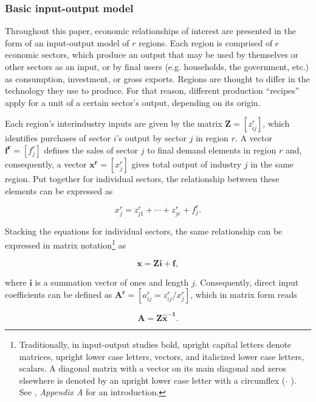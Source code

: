 \documentclass[a4paper,12pt, ]{article}
\begin{document}
\subsubsection[]{Basic input-output model} 
\label{sec:basicio}

Throughout this paper, economic relationships of interest are presented in the form of an input-output model of $r$ regions. Each region is comprised of $e$ economic sectors, which produce an output that may be used by themselves or other sectors as an input, or by final users (e.g. households, the government, etc.) as consumption, investment, or gross exports. Regions are thought to differ in the technology they use to produce. For that reason, different production ``recipes'' apply for a unit of a certain sector's
output, depending on its origin.

Each region's interindustry inputs are given by the matrix $\mathbf{Z}=[z^r_{ij}]$, which identifies purchases of sector $i$'s output by sector $j$ in region $r$. A vector $\mathbf{f^r}=[f^r_j]$ defines the sales of sector $j$ to final demand elements in region $r$ and, consequently, a vector $\mathbf{x^r}=[x^r_j]$ gives total output of industry $j$ in the same region. Put together for individual sectors, the relationship between these elements can be expressed as

\begin{equation} 
x^r_j=z^r_{j1}+\cdots+z^r_{je}+f^r_j. 
\label{01} 
\end{equation} 

Stacking the equations for individual sectors, the same relationship can be expressed in matrix notation\footnote{Traditionally, in input-output studies bold, upright capital letters denote matrices, upright lower case letters, vectors, and italicized lower case letters, scalars. A diagonal matrix with a vector on its main diagonal and zeros elsewhere is denoted by an upright lower case letter with a circumflex ( $\mathbf{\hat{}}$ ). See \citet{miller2009}, \textit{Appendix A} for an introduction.} as

\begin{equation}
\mathbf{x = Zi + f}, \label{02} 
\end{equation}

\noindent where $\mathbf{i}$ is a summation vector of ones and length $j$. Consequently, direct input coefficients can be defined as
$\mathbf{A^r}=[a^r_{ij} = z^r_{ij}/x^r_j]$, which in matrix form reads

\begin{equation} 
\mathbf{A = Z\hat{x}^{-1}}. 
\label{03} 
\end{equation}
\end{document}
